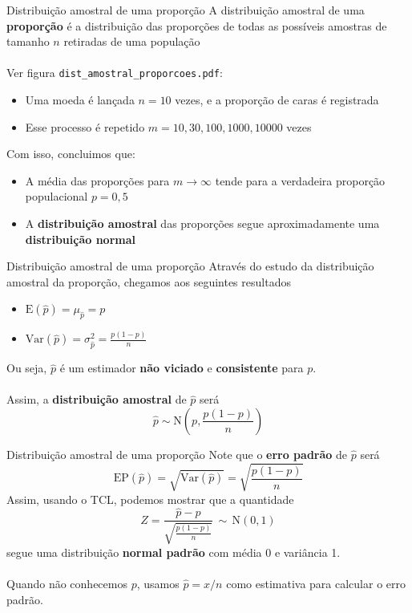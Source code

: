 \documentclass[10pt]{beamer}\usepackage[]{graphicx}\usepackage[]{color}
\providecommand{\E}{\text{E}}
\providecommand{\Var}{\text{Var}}
\providecommand{\EP}{\text{EP}}
\providecommand{\N}{\text{N}}
\theoremstyle{definition}
\begin{document}
\begin{frame}{Distribuição amostral de uma proporção}
  A distribuição amostral de uma \textbf{proporção} é a distribuição das
  proporções de todas as possíveis amostras de tamanho $n$ retiradas de
  uma população \\~\\
  Ver figura \texttt{dist\_amostral\_proporcoes.pdf}:
  \begin{itemize}
  \item Uma moeda é lançada $n=10$ vezes, e a proporção de caras é
    registrada
  \item Esse processo é repetido $m = 10, 30, 100, 1000, 10000$ vezes
  \end{itemize}
  \vspace{1em}
  Com isso, concluimos que:
  \begin{itemize}
  \item A média das proporções para $m \to \infty$ tende para a
    verdadeira proporção populacional $p = 0,5$
  \item A \textbf{distribuição amostral} das proporções segue
    aproximadamente uma \textbf{distribuição normal}
  \end{itemize}
\end{frame}

\begin{frame}{Distribuição amostral de uma proporção}
  Através do estudo da distribuição amostral da proporção, chegamos aos
  seguintes resultados
  \begin{itemize}
  \item $\E(\hat{p}) = \mu_{\hat{p}} = p$
  \item $\Var(\hat{p}) = \sigma^{2}_{\hat{p}} = \frac{p(1-p)}{n}$
  \end{itemize}
  \vspace{1em}

  Ou seja, $\hat{p}$ é um estimador \textbf{não viciado} e
  \textbf{consistente} para $p$. \\~\\
  Assim, a \textbf{distribuição amostral} de $\hat{p}$ será
  \begin{equation*}
    \hat{p} \sim \N \left( p, \frac{p(1-p)}{n} \right)
  \end{equation*}
\end{frame}

\begin{frame}{Distribuição amostral de uma proporção}
  Note que o \textbf{erro padrão} de $\hat{p}$ será
  \begin{equation*}
    \EP(\hat{p}) = \sqrt{\Var(\hat{p})} = \sqrt{\frac{p(1-p)}{n}}
  \end{equation*}
  Assim, usando o TCL, podemos mostrar que a quantidade
  \begin{equation*}
    Z = \frac{\hat{p} - p}{\sqrt{\frac{p(1-p)}{n}}} \, \sim \, \N(0,1)
  \end{equation*}
  segue uma distribuição \textbf{normal padrão} com média 0 e variância
  1. \\~\\
  Quando não conhecemos $p$, usamos $\hat{p} = x/n$ como estimativa para
  calcular o erro padrão.
\end{frame}
\end{document}
